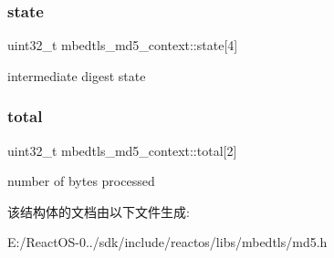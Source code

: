 \subsubsection{\texorpdfstring{state}{state}}
{\footnotesize\ttfamily uint32\+\_\+t mbedtls\+\_\+md5\+\_\+context\+::state\mbox{[}4\mbox{]}}

intermediate digest state \mbox{\label{structmbedtls__md5__context_a69e02fc353b932fe9f58fcae64506c6e}} 
\subsubsection{\texorpdfstring{total}{total}}
{\footnotesize\ttfamily uint32\+\_\+t mbedtls\+\_\+md5\+\_\+context\+::total\mbox{[}2\mbox{]}}

number of bytes processed 

该结构体的文档由以下文件生成\+:\begin{DoxyCompactItemize}
\item 
E\+:/\+React\+O\+S-\/0../sdk/include/reactos/libs/mbedtls/md5.\+h\end{DoxyCompactItemize}
